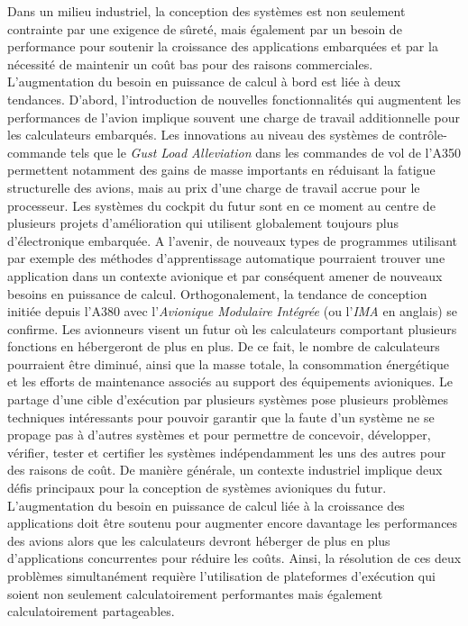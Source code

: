 \documentclass[main.tex]{subfiles}
\begin{document}
Dans un milieu industriel, la conception des systèmes est non seulement contrainte par une exigence de sûreté, mais également par un besoin de performance pour soutenir la croissance des applications embarquées et par la nécessité de maintenir un coût bas pour des raisons commerciales. L'augmentation du besoin en puissance de calcul à bord est liée à deux tendances. D'abord, l'introduction de nouvelles fonctionnalités qui augmentent les performances de l'avion implique souvent une charge de travail additionnelle pour les calculateurs embarqués. Les innovations au niveau des systèmes de contrôle-commande tels que le \emph{Gust Load Alleviation} dans les commandes de vol de l'A350 permettent notamment des gains de masse importants en réduisant la fatigue structurelle des avions, mais au prix d'une charge de travail accrue pour le processeur. Les systèmes du cockpit du futur sont en ce moment au centre de plusieurs projets d'amélioration qui utilisent globalement toujours plus d'électronique embarquée. A l'avenir, de nouveaux types de programmes utilisant par exemple des méthodes d'apprentissage automatique pourraient trouver une application dans un contexte avionique et par conséquent amener de nouveaux besoins en puissance de calcul. Orthogonalement, la tendance de conception initiée depuis l'A380 avec l'\emph{Avionique Modulaire Intégrée} (ou l'\emph{IMA} en anglais) se confirme. Les avionneurs visent un futur où les calculateurs comportant plusieurs fonctions en hébergeront de plus en plus. De ce fait, le nombre de calculateurs pourraient être diminué, ainsi que la masse totale, la consommation énergétique et les efforts de maintenance associés au support des équipements avioniques. Le partage d'une cible d'exécution par plusieurs systèmes pose plusieurs problèmes techniques intéressants pour pouvoir garantir que la faute d'un système ne se propage pas à d'autres systèmes et pour permettre de concevoir, développer, vérifier, tester et certifier les systèmes indépendamment les uns des autres pour des raisons de coût.
De manière générale, un contexte industriel implique deux défis principaux pour la conception de systèmes avioniques du futur. L'augmentation du besoin en puissance de calcul liée à la croissance des applications doit être soutenu pour augmenter encore davantage les performances des avions alors que les calculateurs devront héberger de plus en plus d'applications concurrentes pour réduire les coûts. Ainsi, la résolution de ces deux problèmes simultanément requière l'utilisation de plateformes d'exécution qui soient non seulement calculatoirement performantes mais également calculatoirement partageables.
\end{document}
